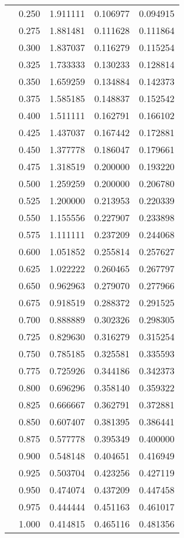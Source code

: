 \begin{tabular}{llrrr}
         & 0.250 &   1.911111 &   0.106977 &   0.094915 \\
         & 0.275 &   1.881481 &   0.111628 &   0.111864 \\
         & 0.300 &   1.837037 &   0.116279 &   0.115254 \\
         & 0.325 &   1.733333 &   0.130233 &   0.128814 \\
         & 0.350 &   1.659259 &   0.134884 &   0.142373 \\
         & 0.375 &   1.585185 &   0.148837 &   0.152542 \\
         & 0.400 &   1.511111 &   0.162791 &   0.166102 \\
         & 0.425 &   1.437037 &   0.167442 &   0.172881 \\
         & 0.450 &   1.377778 &   0.186047 &   0.179661 \\
         & 0.475 &   1.318519 &   0.200000 &   0.193220 \\
         & 0.500 &   1.259259 &   0.200000 &   0.206780 \\
         & 0.525 &   1.200000 &   0.213953 &   0.220339 \\
         & 0.550 &   1.155556 &   0.227907 &   0.233898 \\
         & 0.575 &   1.111111 &   0.237209 &   0.244068 \\
         & 0.600 &   1.051852 &   0.255814 &   0.257627 \\
         & 0.625 &   1.022222 &   0.260465 &   0.267797 \\
         & 0.650 &   0.962963 &   0.279070 &   0.277966 \\
         & 0.675 &   0.918519 &   0.288372 &   0.291525 \\
         & 0.700 &   0.888889 &   0.302326 &   0.298305 \\
         & 0.725 &   0.829630 &   0.316279 &   0.315254 \\
         & 0.750 &   0.785185 &   0.325581 &   0.335593 \\
         & 0.775 &   0.725926 &   0.344186 &   0.342373 \\
         & 0.800 &   0.696296 &   0.358140 &   0.359322 \\
         & 0.825 &   0.666667 &   0.362791 &   0.372881 \\
         & 0.850 &   0.607407 &   0.381395 &   0.386441 \\
         & 0.875 &   0.577778 &   0.395349 &   0.400000 \\
         & 0.900 &   0.548148 &   0.404651 &   0.416949 \\
         & 0.925 &   0.503704 &   0.423256 &   0.427119 \\
         & 0.950 &   0.474074 &   0.437209 &   0.447458 \\
         & 0.975 &   0.444444 &   0.451163 &   0.461017 \\
         & 1.000 &   0.414815 &   0.465116 &   0.481356 \\
\bottomrule
\end{tabular}
